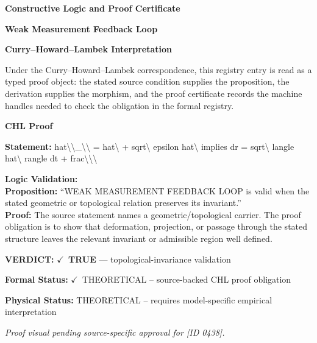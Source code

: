 \clearpage
\begingroup\tzpsupportsetup
\noindent\textbf{\fontsize{10.8pt}{12.8pt}\selectfont [ID 0438] Constructive Logic and Proof Certificate}\par
\noindent\textbf{\fontsize{10pt}{12pt}\selectfont Weak Measurement Feedback Loop}\par
\vspace{0.45em}
\begingroup
\footnotesize
\setlength{\parskip}{0.22em}
\setlength{\parindent}{0pt}
\noindent\textbf{Curry--Howard--Lambek Interpretation}\par
Under the Curry--Howard--Lambek correspondence, this registry entry is read as a typed proof
object: the stated source condition supplies the proposition, the derivation supplies the
morphism, and the proof certificate records the machine handles needed to check the obligation
in the formal registry.

\vspace{0.45em}
\noindent\textbf{CHL Proof}\par
\textbf{Statement:} hat\textbackslash{}\textbackslash{}\_\textbackslash{}\textbackslash{} = hat\textbackslash{} + sqrt\textbackslash{} epsilon hat\textbackslash{} implies dr = sqrt\textbackslash{} langle hat\textbackslash{} rangle dt + frac\textbackslash{}\textbackslash{}\textbackslash{}

\textbf{Logic Validation:}\\
\textbf{Proposition:} ``WEAK MEASUREMENT FEEDBACK LOOP is valid when the stated geometric or topological
relation preserves its invariant.''\\
\textbf{Proof:} The source statement names a geometric/topological carrier. The proof obligation is to
show that deformation, projection, or passage through the stated structure leaves the
relevant invariant or admissible region well defined.

\textbf{VERDICT:} \ensuremath{\checkmark}\ \textbf{TRUE} --- topological-invariance validation

\textbf{Formal Status:} \ensuremath{\checkmark}\ THEORETICAL -- source-backed CHL proof obligation

\textbf{Physical Status:} THEORETICAL -- requires model-specific empirical interpretation
\par\vspace{0.45em}
\par
\vfill
\begingroup\footnotesize\itshape
Proof visual pending source-specific approval for [ID 0438].
\par\endgroup
\vfill
\endgroup
\endgroup
